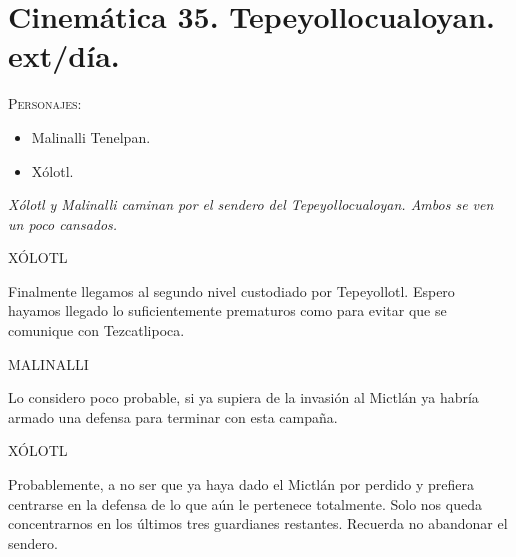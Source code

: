 \documentclass[11pt,letterpaper]{article}
\begin{document}
\section{Cinemática 35. Tepeyollocualoyan. ext/día. }
 \textsc{Personajes}:
 \begin{itemize}
 \item Malinalli Tenelpan.
\item Xólotl.
 \end{itemize}
\textit{Xólotl y Malinalli caminan por el sendero del Tepeyollocualoyan. Ambos se ven un poco cansados. }
\begin{center}
XÓLOTL
\\
\par
Finalmente llegamos al segundo nivel custodiado por Tepeyollotl. Espero hayamos llegado lo suficientemente prematuros como para evitar que se comunique con Tezcatlipoca.
\\
\par
MALINALLI
\\
\par
Lo considero poco probable, si ya supiera de la invasión al Mictlán ya habría armado una defensa para terminar con esta campaña.
\\
\par
XÓLOTL
\\
\par
Probablemente, a no ser que ya haya dado el Mictlán por perdido y prefiera centrarse en la defensa de lo que aún le pertenece totalmente. Solo nos queda concentrarnos en los últimos tres guardianes restantes. Recuerda no abandonar el sendero.
\end{center}
\end{document}

